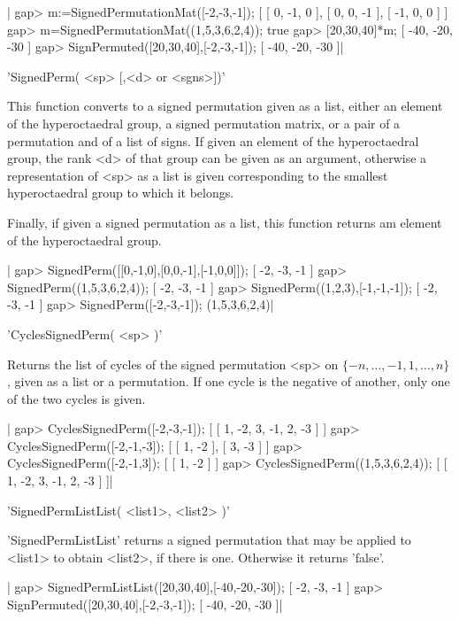 |    gap> m:=SignedPermutationMat([-2,-3,-1]);
    [ [ 0, -1, 0 ], [ 0, 0, -1 ], [ -1, 0, 0 ] ]
    gap> m=SignedPermutationMat((1,5,3,6,2,4));
    true
    gap> [20,30,40]*m;
    [ -40, -20, -30 ]
    gap> SignPermuted([20,30,40],[-2,-3,-1]);
    [ -40, -20, -30 ]|

%
%

'SignedPerm( <sp> [,<d> or <sgns>])'

This  function converts to a signed permutation  given as a list, either an
element of the hyperoctaedral group, a signed permutation matrix, or a pair
of  a  permutation  and  of  a  list  of  signs. If given an element of the
hyperoctaedral  group,  the  rank  <d>  of  that  group  can be given as an
argument,   otherwise  a  representation  of  <sp>   as  a  list  is  given
corresponding to the smallest hyperoctaedral group to which it belongs.

Finally, if given a signed permutation as a list, this function returns
am element of the hyperoctaedral group.

|    gap> SignedPerm([[0,-1,0],[0,0,-1],[-1,0,0]]);
    [ -2, -3, -1 ]
    gap> SignedPerm((1,5,3,6,2,4));
    [ -2, -3, -1 ]
    gap> SignedPerm((1,2,3),[-1,-1,-1]);
    [ -2, -3, -1 ]
    gap> SignedPerm([-2,-3,-1]);
    (1,5,3,6,2,4)|

%
%

'CyclesSignedPerm( <sp> )'

Returns   the  list   of  cycles   of  the   signed  permutation   <sp>  on
$\{-n,\ldots,-1,1,\ldots,n\}$,  given as  a list  or a  permutation. If one
cycle is the negative of another, only one of the two cycles is given.

|    gap> CyclesSignedPerm([-2,-3,-1]);
    [ [ 1, -2, 3, -1, 2, -3 ] ]
    gap> CyclesSignedPerm([-2,-1,-3]);
    [ [ 1, -2 ], [ 3, -3 ] ]
    gap> CyclesSignedPerm([-2,-1,3]);
    [ [ 1, -2 ] ]
    gap> CyclesSignedPerm((1,5,3,6,2,4));
    [ [ 1, -2, 3, -1, 2, -3 ] ]|

%
%

    'SignedPermListList( <list1>, <list2> )'

'SignedPermListList'  returns a signed  permutation that may  be applied to
<list1> to obtain <list2>, if there is one. Otherwise it returns 'false'.

|    gap> SignedPermListList([20,30,40],[-40,-20,-30]);
    [ -2, -3, -1 ]
    gap> SignPermuted([20,30,40],[-2,-3,-1]);
    [ -40, -20, -30 ]|

